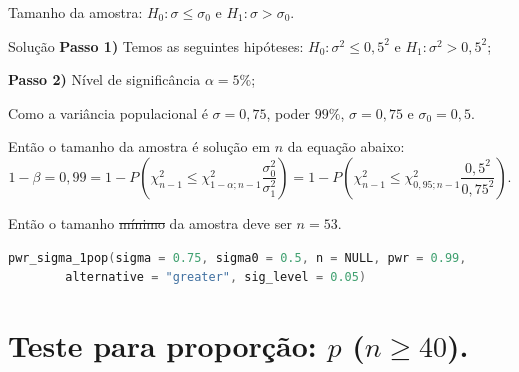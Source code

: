 \documentclass[8pt]{beamer}
\begin{document}
\begin{frame}[fragile]{Tamanho da amostra: $H_0: \sigma \leq \sigma_0$ e $H_1: \sigma > \sigma_0$.}

\normalsize
\begin{block}{Solução}
	\textbf{Passo 1)} Temos as seguintes hipóteses: $H_0: \sigma^2 \leq 0,5^2$ e $H_1: \sigma^2 > 0,5^2$;
	
	\textbf{Passo 2)} Nível de significância $\alpha = 5\%$;
	
	Como a variância populacional é $\sigma=0,75$, poder $99\%$, $\sigma=0,75$ e $\sigma_0 = 0,5$.
	
	Então o tamanho da amostra é solução em $n$ da equação abaixo:
	$$1-\beta=0,99 =1- P \left( \chi_{n-1}^2 \leq \chi_{1-\alpha;n-1}^2 \frac{\sigma_0^2}{\sigma_1^2} \right) =1- P \left( \chi_{n-1}^2 \leq \chi_{0,95;n-1}^2 \frac{0,5^2}{0,75^2} \right).$$
	
	Então o tamanho \sout{mínimo} da amostra deve ser $n=53$.
\end{block}

\begin{lstlisting}[language = C, caption = Código no R.]
pwr_sigma_1pop(sigma = 0.75, sigma0 = 0.5, n = NULL, pwr = 0.99,
		alternative = "greater", sig_level = 0.05)
\end{lstlisting}

\normalsize
\end{frame}

\section{Teste para proporção: $p$ ($n \geq 40$).}
\end{document}
